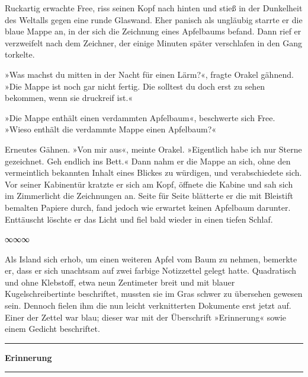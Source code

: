 Ruckartig erwachte Free, riss seinen Kopf nach hinten und stieß in der Dunkelheit des Weltalls gegen eine runde Glaswand. Eher panisch als ungläubig starrte er die blaue Mappe an, in der sich die Zeichnung eines Apfelbaums befand. Dann rief er verzweifelt nach dem Zeichner, der einige Minuten später verschlafen in den Gang torkelte.

»Was machst du mitten in der Nacht für einen Lärm?«, fragte Orakel gähnend. »Die Mappe ist noch gar nicht fertig. Die solltest du doch erst zu sehen bekommen, wenn sie druckreif ist.«

»Die Mappe enthält einen verdammten Apfelbaum«, beschwerte sich Free. »Wieso enthält die verdammte Mappe einen Apfelbaum?«

Erneutes Gähnen. »Von mir aus«, meinte Orakel. »Eigentlich habe ich nur Sterne gezeichnet. Geh endlich ins Bett.« Dann nahm er die Mappe an sich, ohne den vermeintlich bekannten Inhalt eines Blickes zu würdigen, und verabschiedete sich. Vor seiner Kabinentür kratzte er sich am Kopf, öffnete die Kabine und sah sich im Zimmerlicht die Zeichnungen an. Seite für Seite blätterte er die mit Bleistift bemalten Papiere durch, fand jedoch wie erwartet keinen Apfelbaum darunter. Enttäuscht löschte er das Licht und fiel bald wieder in einen tiefen Schlaf.

\begin{center}
∞∞∞
\end{center}

Als Island sich erhob, um einen weiteren Apfel vom Baum zu nehmen, bemerkte er, dass er sich unachtsam auf zwei farbige Notizzettel gelegt hatte. Quadratisch und ohne Klebstoff, etwa neun Zentimeter breit und mit blauer Kugelschreibertinte beschriftet, mussten sie im Gras schwer zu übersehen gewesen sein. Dennoch fielen ihm die nun leicht verknitterten Dokumente erst jetzt auf. Einer der Zettel war blau; dieser war mit der Überschrift »Erinnerung« sowie einem Gedicht beschriftet.

\noindent \parbox{\textwidth}{ \vspace{3ex} \hrule \vspace{3ex}

\textbf{Erinnerung}


\vspace{3ex} \hrule \vspace{3ex} }

